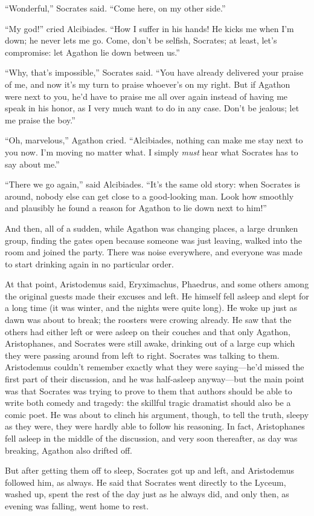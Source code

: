 “Wonderful,” Socrates said. “Come here, on my other side.”

“My god!” cried Alcibiades. “How I suffer in his hands! He kicks me when
I’m down; he never lets me go. Come, don’t be selfish, Socrates; at
least, let’s compromise: let Agathon lie down between us.”

“Why, that’s impossible,” Socrates said. “You have already delivered
your praise of me, and now it’s my turn to praise whoever’s on my right.
But if Agathon were next to you, he’d have to praise me all over again
 instead of having me speak in his honor, as I very much
want to do in any case. Don’t be jealous; let me praise the boy.”

“Oh, marvelous,” Agathon cried. “Alcibiades, nothing can make me stay
next to you now. I’m moving no matter what. I simply {\em must} hear
what Socrates has to say about me.”

“There we go again,” said Alcibiades. “It’s the same old story: when
Socrates is around, nobody else can get close to a good-looking man.
Look  how smoothly and plausibly he found a reason for Agathon to
lie down next to him!”

And then, all of a sudden, while Agathon was changing places, a large
drunken group, finding the gates open because someone was just leaving,
walked into the room and joined the party. There was noise everywhere,
and everyone was made to start drinking again in no particular order.

At that point, Aristodemus said, Eryximachus, Phaedrus, and some 
others among the original guests made their excuses and left. He himself
fell asleep and slept for a long time (it was winter, and the nights
were quite long). He woke up just as dawn was about to break; the
roosters were crowing already. He saw that the others had either left or
were asleep on their couches and that only Agathon, Aristophanes, and
Socrates were still awake, drinking out of a large cup which they were
passing around  from left to right. Socrates was talking to them.
Aristodemus couldn’t remember exactly what they were saying---he’d
missed the first part of their discussion, and he was half-asleep
anyway---but the main point was that Socrates was trying to prove to
them that authors should be able to write both comedy and tragedy: the
skillful tragic dramatist should also be a comic poet. He was about to
clinch his argument, though, to tell the truth, sleepy as they were,
they were hardly able to follow his reasoning. In fact, Aristophanes
fell asleep in the middle of the discussion, and very soon thereafter,
as day was breaking, Agathon also drifted off.

But after getting them off to sleep, Socrates got up and left, and
Aristodemus followed him, as always. He said that Socrates went directly
to the Lyceum, washed up, spent the rest of the day just as he always
did, and only then, as evening was falling, went home to rest.
\stopchapter
